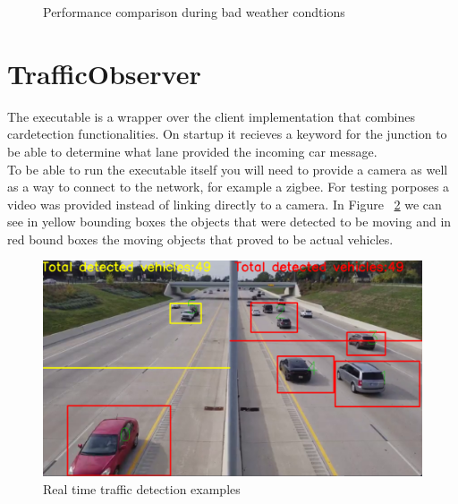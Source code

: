 \documentclass[17pt]{report}
\begin{document}
\begin{figure}[h!]
    \centering
    \label{fig:Optimizer vs no optimizers in rain}
    \caption{Performance comparison during bad weather condtions}
\end{figure}


\pagebreak
\section{TrafficObserver}
\indent \indent
The executable is a wrapper over the client implementation that combines
cardetection functionalities. On startup it recieves a keyword for the junction to be able
to determine what lane provided the incoming car message. \\
\indent
To be able to run the executable itself you will need to provide a camera as well as a way to 
connect to the network, for example a zigbee. For testing porposes a
video was provided instead of linking directly to a camera. In Figure 
~\ref{fig:Running client samples} we can see in yellow bounding boxes 
the objects that were detected to be moving and in red bound boxes 
the moving objects that proved to be actual vehicles.

\begin{figure}[h!]
    \includegraphics[width=\textwidth]{TrafficDetectionRunningExample2.png}
    \caption{Real time traffic detection examples}
    \label{fig:Running client samples}
\end{figure}
\end{document}
